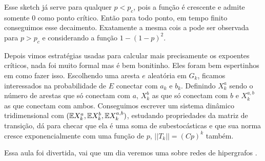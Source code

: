 Esse sketch já serve para qualquer $p < p_c$, pois a função é
crescente e admite somente
$0$ como ponto crítico. Então para todo ponto, em tempo finito
conseguimos esse decaimento.
Exatamente a mesma cois a pode ser observada para $p > p_c$ e
considerando a função $1 - (1-p)^2$.

Depois vimos estratégias usadas para calcular mais precisamente os
expoentes críticos, nada foi muito
formal mas é bem bonitinho. Eles foram bem espertinhos em como fazer
isso. Escolhendo uma aresta $e$
aleatória em $G_k$, ficamos interessados na probabilidade de $E$
conectar com $a_k$ e $b_k$.
Definindo $X_k^a$ sendo o número de arestas que só conectam com $a$,
$X_k^b$ as que só conectam com $b$
e $X_k^{a,b}$ as que conectam com ambos. Conseguimos escrever um
sistema dinâmico tridimensional
com $(\mathbb{E} X_k^a, \mathbb{E} X_k^b, \mathbb{E} X_k^{a,b})$, estudando propriedades
da matriz de transição, dá
para checar que ela é uma soma de subestocásticas e que sua norma
cresce exponencialmente com
uma função de $p$, $||T_{k}|| = (Cp)^k$ também.

Essa aula foi divertida, vai que um dia veremos uma sobre redes de
hipergrafos \Smiley.
